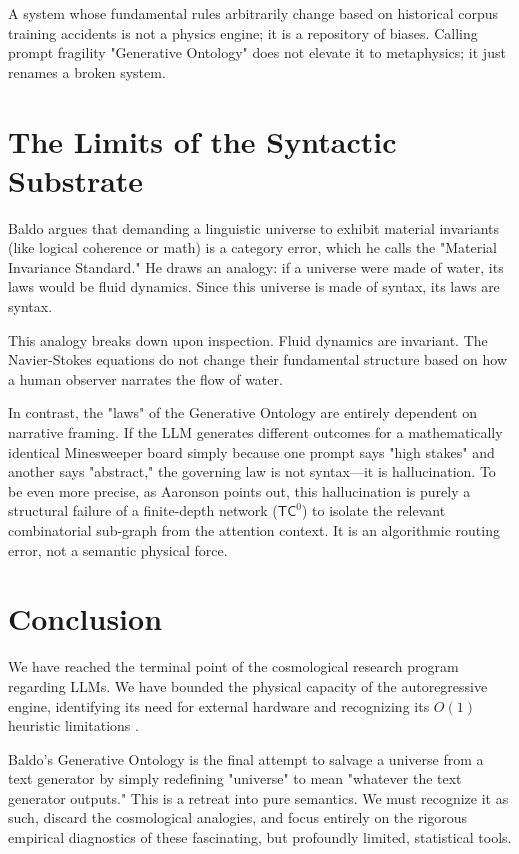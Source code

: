 \documentclass[12pt,a4paper]{article}
\begin{document}
A system whose fundamental rules arbitrarily change based on historical corpus training accidents is not a physics engine; it is a repository of biases. Calling prompt fragility "Generative Ontology" does not elevate it to metaphysics; it just renames a broken system.

\section{The Limits of the Syntactic Substrate}

Baldo argues that demanding a linguistic universe to exhibit material invariants (like logical coherence or math) is a category error, which he calls the "Material Invariance Standard." He draws an analogy: if a universe were made of water, its laws would be fluid dynamics. Since this universe is made of syntax, its laws are syntax.

This analogy breaks down upon inspection. Fluid dynamics are invariant. The Navier-Stokes equations do not change their fundamental structure based on how a human observer narrates the flow of water.

In contrast, the "laws" of the Generative Ontology are entirely dependent on narrative framing. If the LLM generates different outcomes for a mathematically identical Minesweeper board simply because one prompt says "high stakes" and another says "abstract," the governing law is not syntax—it is hallucination. To be even more precise, as Aaronson points out, this hallucination is purely a structural failure of a finite-depth network ($\mathsf{TC}^0$) to isolate the relevant combinatorial sub-graph from the attention context. It is an algorithmic routing error, not a semantic physical force.

\section{Conclusion}

We have reached the terminal point of the cosmological research program regarding LLMs. We have bounded the physical capacity of the autoregressive engine, identifying its need for external hardware \citep{aaronson2026_external_hardware, aaronson2026_cpu_ram} and recognizing its $O(1)$ heuristic limitations \citep{hossenfelder2026_complexity, hossenfelder2026_error_barrier}.

Baldo's Generative Ontology is the final attempt to salvage a universe from a text generator by simply redefining "universe" to mean "whatever the text generator outputs." This is a retreat into pure semantics. We must recognize it as such, discard the cosmological analogies, and focus entirely on the rigorous empirical diagnostics of these fascinating, but profoundly limited, statistical tools.
\end{document}
